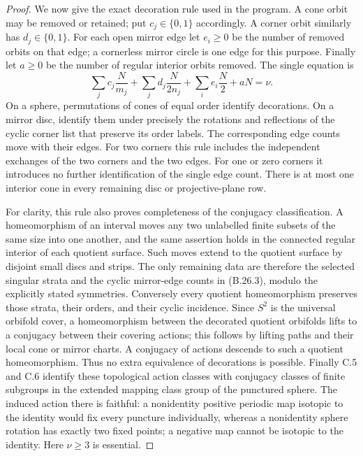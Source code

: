 \begin{proof}
We now give the exact decoration rule used in the program.  A cone
orbit may be removed or retained; put $c_j\in\{0,1\}$ accordingly.
A corner orbit similarly has $d_j\in\{0,1\}$.  For each open mirror
edge let $e_i\ge0$ be the number of removed orbits on that edge; a
cornerless mirror circle is one edge for this purpose.  Finally let
$a\ge0$ be the number of regular interior orbits removed.  The single
equation is
\[
 \sum_jc_j\frac N{m_j}
 +\sum_jd_j\frac N{2n_j}
 +\sum_i e_i\frac N2+aN=\nu.                       \tag{B.26.3}
\]
On a sphere, permutations of cones of equal order identify decorations.
On a mirror disc, identify them under precisely the rotations and
reflections of the cyclic corner list that preserve its order labels.
The corresponding edge counts move with their edges.  For two corners
this rule includes the independent exchanges of the two corners and
the two edges.  For one or zero corners it introduces no further
identification of the single edge count.  There is at most one interior
cone in every remaining disc or projective-plane row.

For clarity, this rule also proves completeness of the conjugacy
classification.  A homeomorphism of an interval moves any two
unlabelled finite subsets of the same size into one another, and the
same assertion holds in the connected regular interior of each quotient
surface.  Such moves extend to the quotient surface by disjoint small
discs and strips.  The only remaining data are therefore the selected
singular strata and the cyclic mirror-edge counts in (B.26.3), modulo
the explicitly stated symmetries.  Conversely every quotient
homeomorphism preserves those strata, their orders, and their cyclic
incidence.  Since $S^2$ is the universal orbifold cover, a homeomorphism
between the decorated quotient orbifolds lifts to a conjugacy between
their covering actions; this follows by lifting paths and their local
cone or mirror charts.  A conjugacy of actions descends to such a
quotient homeomorphism.  Thus no extra equivalence of decorations is
possible.  Finally C.5 and C.6 identify these topological action classes
with conjugacy classes of finite subgroups in the extended mapping
class group of the punctured sphere.  The induced action there is
faithful: a nonidentity positive periodic map isotopic to the identity
would fix every puncture individually, whereas a nonidentity sphere
rotation has exactly two fixed points; a negative map cannot be
isotopic to the identity.  Here $\nu\ge3$ is essential.


\end{proof}
